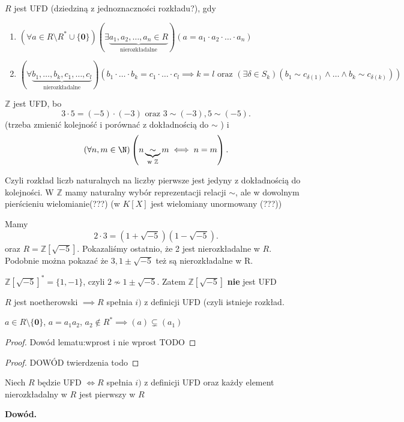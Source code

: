 \begin{definition}[UFD]
	$R$ jest UFD (dziedziną z jednoznaczności rozkładu?), gdy 
	\begin{enumerate}[label=\arabic*)]
		\item $\left(\forall a\in R\setminus R^{\ast} \cup \{\mathbf{0}\} \right)\left(\exists \underbrace{a_1,a_2,\ldots,a_{n} \in R}_{\text{nierozkładalne}} \right) \left( a = a_1\cdot a_2\cdot \ldots \cdot a_{n} \right)   $ 
		\item $\left(\forall \underbrace{b_1,\ldots,b_{k},c_1,\ldots,c_{l}}_{\text{nierozkładalne}}  \right) \left( b_1\cdot \ldots\cdot b_{k} = c_1\cdot \ldots\cdot c_{l} \implies k = l \text{ oraz } \left(\exists \delta \in S_{k}  \right) \left( b_1\sim c_{\delta(1)}\land \ldots\land b_{k} \sim c_{\delta(k)}   \right)  \right)  $
	\end{enumerate}
\end{definition} 
\begin{eg}
	$\mathbb{Z} $ jest UFD, bo
	\[
	3\cdot 5 = \left( -5 \right) \cdot \left( -3 \right) \text{ oraz } 3\sim \left( -3 \right), 5 \sim \left( -5 \right)   
	.\] 
	(trzeba zmienić kolejność i porównać z dokładnością do $\sim  $ )
	i
	\[
	\left(\forall n,m \in \N \right)\left( n \underbrace{\sim  }_{\text{w } \mathbb{Z} } m \iff n=m\right)  
	.\] 

	\noindent Czyli rozkład liczb naturalnych na liczby pierwsze jest jedyny z dokładnością do kolejności. W $\mathbb{Z} $ mamy naturalny wybór reprezentacji relacji $\sim  $, ale w dowolnym pierścieniu  wielomianie(???) (w $K\left[ X \right] $ jest wielomiany unormowany (???))
\end{eg} 
\begin{eg}
	Mamy
	\[
	2\cdot 3 = \left( 1 + \sqrt{-5}  \right) \left( 1- \sqrt{-5}  \right) 
	.\] 
	oraz $R = \mathbb{Z} \left[ \sqrt{-5}  \right] $. Pokazaliśmy ostatnio, że 2 jest nierozkładalne w $R$. Podobnie można pokazać że $3, 1\pm\sqrt{-5} $ też są nierozkładalne w R.
\end{eg} 
\begin{eg}
	$\mathbb{Z} \left[ \sqrt{-5}  \right] ^{\ast} = \{1,-1\} $, czyli $2 \not\sim 1\pm\sqrt{-5}  $. Zatem $\mathbb{Z} \left[ \sqrt{-5}  \right] $ \textbf{nie} jest UFD
\end{eg} 
\begin{theorem}
	$R$ jest noetherowski $\implies R$ spełnia $i)$ z definicji UFD (czyli istnieje rozkład.
\end{theorem} 
\begin{lemma}
	$a\in R\setminus \{\mathbf{0}\} $, $a = a_1a_2$, $a_2\not\in R^{\ast} \implies \left( a \right) \varsubsetneq \left( a_1 \right) $
\end{lemma} 
\begin{proof}
	Dowód lematu:wprost i nie wprost TODO
\end{proof} 
\begin{proof}
	DOWÓD twierdzenia todo
\end{proof} 
\begin{theorem}
	Niech $R$ będzie UFD $\iff R$ spełnia $i)$ z definicji UFD oraz każdy element nierozkładalny w $R$ jest pierwszy w $R$  
\end{theorem} 
\textbf{Dowód.}

